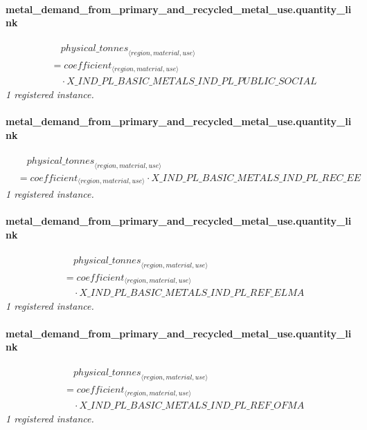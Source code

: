 \documentclass[11pt]{article}
\begin{document}
\paragraph{metal\_demand\_from\_primary\_and\_recycled\_metal\_use.quantity\_link}
\begin{align*}
&\quad {physical\_tonnes}_{\langle region, material, use\rangle}\\
&= coefficient_{\langle region, material, use\rangle}\\
&\quad {}\cdot X\_IND\_PL\_BASIC\_METALS\_IND\_PL\_PUBLIC\_SOCIAL
\end{align*}
\noindent\emph{1 registered instance.}\par
\paragraph{metal\_demand\_from\_primary\_and\_recycled\_metal\_use.quantity\_link}
\begin{align*}
&\quad {physical\_tonnes}_{\langle region, material, use\rangle}\\
&= coefficient_{\langle region, material, use\rangle} \cdot X\_IND\_PL\_BASIC\_METALS\_IND\_PL\_REC\_EE
\end{align*}
\noindent\emph{1 registered instance.}\par
\paragraph{metal\_demand\_from\_primary\_and\_recycled\_metal\_use.quantity\_link}
\begin{align*}
&\quad {physical\_tonnes}_{\langle region, material, use\rangle}\\
&= coefficient_{\langle region, material, use\rangle}\\
&\quad {}\cdot X\_IND\_PL\_BASIC\_METALS\_IND\_PL\_REF\_ELMA
\end{align*}
\noindent\emph{1 registered instance.}\par
\paragraph{metal\_demand\_from\_primary\_and\_recycled\_metal\_use.quantity\_link}
\begin{align*}
&\quad {physical\_tonnes}_{\langle region, material, use\rangle}\\
&= coefficient_{\langle region, material, use\rangle}\\
&\quad {}\cdot X\_IND\_PL\_BASIC\_METALS\_IND\_PL\_REF\_OFMA
\end{align*}
\noindent\emph{1 registered instance.}\par
\end{document}
